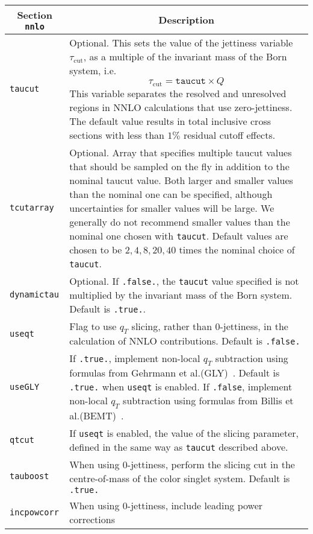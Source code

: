 	\begin{longtable}{p{1.5cm}p{12cm}}
		\hline
		\multicolumn{1}{c}{{\textbf{Section} \texttt{nnlo}}} & \multicolumn{1}{c}{{\textbf{Description}}} \\ 
		\hline
		\texttt{taucut} & 
		Optional. This sets the value of the jettiness variable
		$\tau_{\text{cut}}$, as a multiple of the invariant mass of the Born system,
		i.e.
		\begin{equation}
		\tau_{\text{cut}} = \texttt{taucut} \times Q
		\end{equation}
		This variable separates the resolved and unresolved regions in NNLO
		calculations that use zero-jettiness. The default value results
		in total inclusive cross sections with less than $1\%$ residual cutoff effects. \\
		\texttt{tcutarray} &
		Optional. Array that specifies multiple taucut values that should be sampled
		on the fly in addition to the nominal taucut value. Both larger and smaller
		values than the nominal one can be specified, although uncertainties for
		smaller values will be large. We generally do not recommend smaller values
		than the nominal one chosen with \texttt{taucut}. Default values are chosen
		to be $2,4,8,20,40$ times the nominal choice of \texttt{taucut}.  \\
		\texttt{dynamictau} &
		Optional. If \texttt{.false.}, the \texttt{taucut} value specified
		is not multiplied by the invariant mass of the Born system. Default is \texttt{.true.}. \\
                \texttt{useqt} & Flag to use $q_T$ slicing, rather than
		0-jettiness, in the calculation of NNLO contributions.
		Default is \texttt{.false.} \\
                \texttt{useGLY} & If \texttt{.true.}, implement non-local $q_T$ subtraction using formulas from Gehrmann et al.(GLY)~\cite{Gehrmann:2014yya}.
		Default is \texttt{.true.}  when \texttt{useqt} is enabled.  If \texttt{.false},
		implement non-local $q_T$ subtraction using formulas from Billis et al.(BEMT)~\cite{Billis:2019vxg}. \\
                \texttt{qtcut} & If \texttt{useqt} is enabled, the value of the slicing parameter, defined
		in the same way as \texttt{taucut} described above.  \\
                \texttt{tauboost} & When using 0-jettiness, perform the slicing cut in the
		centre-of-mass of the color singlet system.  Default is \texttt{.true.} \\
                \texttt{incpowcorr} & When using 0-jettiness, include leading power corrections

\end{longtable}
